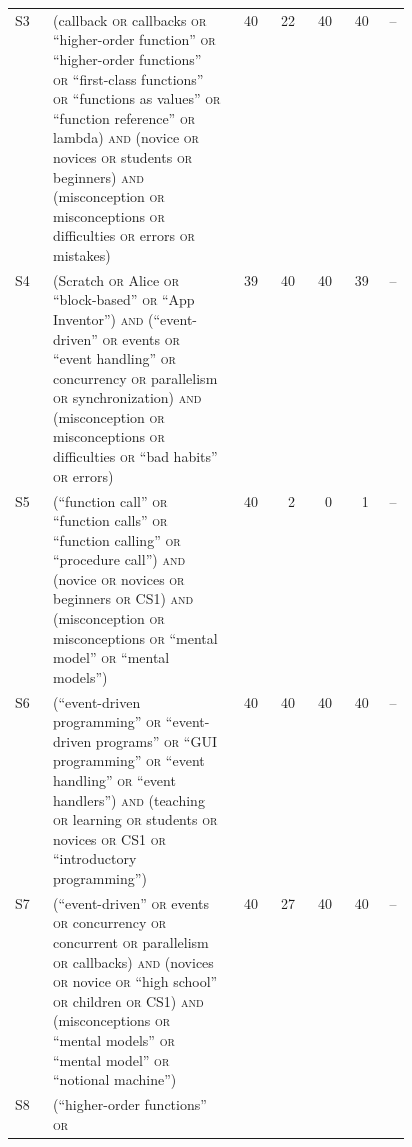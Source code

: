 \begin{table}[htbp]
\begin{tabular}{@{}lp{0.46\linewidth}rrrrr@{}}
    S3 & (callback \textsc{or} callbacks \textsc{or} \enquote{higher-order
       function} \textsc{or} \enquote{higher-order functions} \textsc{or}
       \enquote{first-class functions} \textsc{or} \enquote{functions as
       values} \textsc{or} \enquote{function reference} \textsc{or}
       lambda) \textsc{and} (novice \textsc{or} novices \textsc{or}
       students \textsc{or} beginners) \textsc{and} (misconception
       \textsc{or} misconceptions \textsc{or} difficulties \textsc{or}
       errors \textsc{or} mistakes)
       & 40 & 22 & 40 & 40 & -- \\
    S4 & (Scratch \textsc{or} Alice \textsc{or} \enquote{block-based}
       \textsc{or} \enquote{App Inventor}) \textsc{and}
       (\enquote{event-driven} \textsc{or} events \textsc{or}
       \enquote{event handling} \textsc{or} concurrency \textsc{or}
       parallelism \textsc{or} synchronization) \textsc{and}
       (misconception \textsc{or} misconceptions \textsc{or} difficulties
       \textsc{or} \enquote{bad habits} \textsc{or} errors)
       & 39 & 40 & 40 & 39 & -- \\
    S5 & (\enquote{function call} \textsc{or} \enquote{function calls}
       \textsc{or} \enquote{function calling} \textsc{or}
       \enquote{procedure call}) \textsc{and} (novice \textsc{or} novices
       \textsc{or} beginners \textsc{or} CS1) \textsc{and} (misconception
       \textsc{or} misconceptions \textsc{or} \enquote{mental model}
       \textsc{or} \enquote{mental models})
       & 40 & 2 & 0 & 1 & -- \\
    S6 & (\enquote{event-driven programming} \textsc{or}
       \enquote{event-driven programs} \textsc{or} \enquote{GUI
       programming} \textsc{or} \enquote{event handling} \textsc{or}
       \enquote{event handlers}) \textsc{and} (teaching \textsc{or}
       learning \textsc{or} students \textsc{or} novices \textsc{or} CS1
       \textsc{or} \enquote{introductory programming})
       & 40 & 40 & 40 & 40 & -- \\
    S7 & (\enquote{event-driven} \textsc{or} events \textsc{or}
       concurrency \textsc{or} concurrent \textsc{or} parallelism
       \textsc{or} callbacks) \textsc{and} (novices \textsc{or} novice
       \textsc{or} \enquote{high school} \textsc{or} children \textsc{or}
       CS1) \textsc{and} (misconceptions \textsc{or} \enquote{mental
       models} \textsc{or} \enquote{mental model} \textsc{or}
       \enquote{notional machine})
       & 40 & 27 & 40 & 40 & -- \\
    S8 & (\enquote{higher-order functions} \textsc{or}

\end{tabular}
\end{table}
